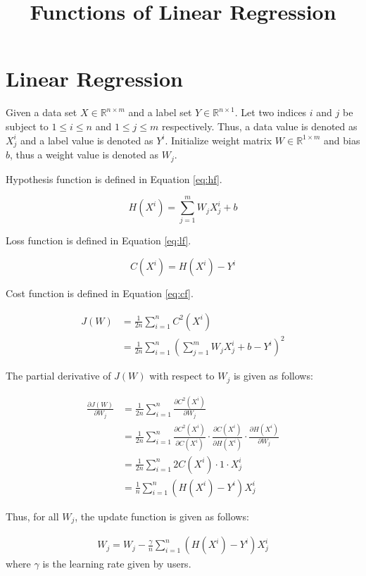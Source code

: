\documentclass[conference]{IEEEtran}
\begin{document}
\title{Functions of Linear Regression}

\author{
}

\maketitle

\section{Linear Regression}

Given a data set $X\in \mathbb{R}^{n\times m}$ and a label set $Y\in \mathbb{R}^{n\times 1}$. Let two indices $i$ and $j$ be subject to $1\leq i\leq n$ and $1\leq j \leq m$ respectively. Thus, a data value is denoted as $X^{i}_{j}$ and a label value is denoted as $Y^{i}$. Initialize weight matrix $W\in \mathbb{R}^{1\times m}$ and bias $b$, thus a weight value is denoted as $W_{j}$.

Hypothesis function is defined in Equation \eqref{eq:hf}.

\begin{equation}
\label{eq:hf}
	H(X^{i})=\sum_{j=1}^{m}W_{j}X^{i}_{j}+b
\end{equation}

Loss function is defined in Equation \eqref{eq:lf}.

\begin{equation}
\label{eq:lf}
	C(X^{i})=H(X^{i})-Y^{i}
\end{equation}

Cost function is defined in Equation \eqref{eq:cf}.

\begin{equation}
\label{eq:cf}
	\begin{aligned}
	J(W)&=\frac{1}{2n}\sum_{i=1}^{n}C^2(X^{i})\\
		&=\frac{1}{2n}\sum_{i=1}^{n}(\sum_{j=1}^{m}W_{j}X^{i}_{j}+b-Y^{i})^{2}
	\end{aligned}
\end{equation}

The partial derivative of $J(W)$ with respect to $W_{j}$ is given as follows:

\begin{align*}
	\frac{\partial{J(W)}}{\partial{W_{j}}}
	&=\frac{1}{2n}\sum_{i=1}^{n}\frac{\partial{C^2(X^{i})}}{\partial{W_{j}}}\\
	&=\frac{1}{2n}\sum_{i=1}^{n}\frac{\partial{C^2(X^{i})}}{\partial{C(X^{i})}}\cdot \frac{\partial{C(X^{i})}}{\partial{H(X^{i})}}\cdot \frac{\partial{H(X^{i})}}{\partial{W_{j}}}\\
	&=\frac{1}{2n}\sum_{i=1}^{n}2C(X^{i})\cdot 1\cdot X^{i}_{j}\\
	&=\frac{1}{n}\sum_{i=1}^{n}(H(X^{i})-Y^{i})X^{i}_{j}
\end{align*}

Thus, for all $W_{j}$, the update function is given as follows:

\begin{align*}
	W_{j}=W_{j}-\frac{\gamma}{n}\sum_{i=1}^{n}(H(X^{i})-Y^{i})X^{i}_{j}
\end{align*}
where $\gamma$ is the learning rate given by users.
\end{document}

